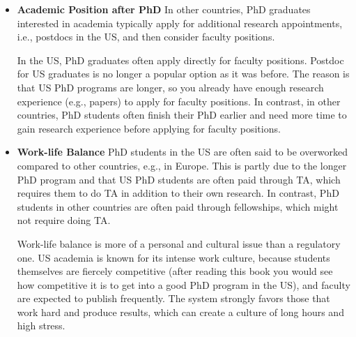 \documentclass[oneside,11pt]{book}
\newenvironment{commentbox}[1][]{
  \small
  \begin{marker}[\faChessPawn{}]
    {\textbf{#1}}
  }{
  \end{marker}
}
\begin{document}
\begin{itemize}
\item \textbf{Academic Position after PhD} In other countries, PhD graduates interested in academia typically apply for additional research appointments, i.e., postdocs in the US, and then consider faculty positions.

In the US, PhD graduates often apply directly for faculty positions. Postdoc for US graduates is no longer a popular option as it was before. The reason is that US PhD programs are longer, so you already have enough research experience (e.g., papers) to apply for faculty positions. In contrast, in other countries, PhD students often finish their PhD earlier and need more time to gain research experience before applying for faculty positions.

  \item \textbf{Work-life Balance} PhD students in the US are often said to be overworked compared to other countries, e.g., in Europe.  This is partly due to the longer PhD program and that US PhD students are often paid through TA, which requires them to do TA in addition to their own research. In contrast, PhD students in other countries are often paid through fellowships, which might not require doing TA.

\begin{commentbox}
  Work-life balance is more of a personal and cultural issue than a regulatory one. US academia is known for its intense work culture, because students themselves are fiercely competitive (after reading this book you would see how competitive it is to get into a good PhD program in the US), and faculty are expected to publish frequently.
  The system strongly favors those that work hard and produce results, which can create a culture of long hours and high stress.
\end{commentbox}
\end{itemize}


  






\end{document}
